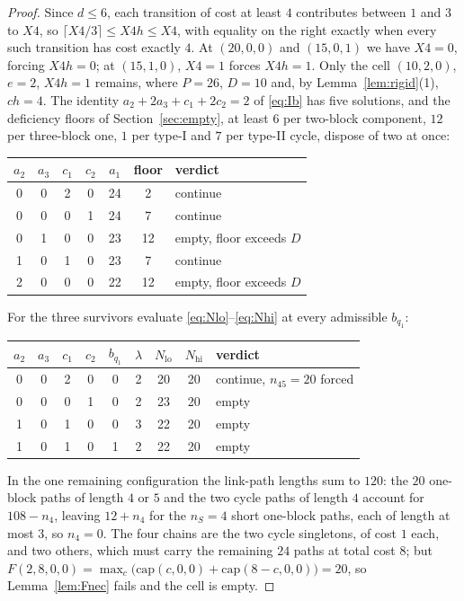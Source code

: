 \documentclass[10pt]{article}
\theoremstyle{remark}
\theoremstyle{plain}
\newcommand{\NCh}{\mathit{ch}}
\begin{document}
\begin{proof}
Since $d\le 6$, each transition of cost at least $4$ contributes
between $1$ and $3$ to $X4$, so $\lceil X4/3\rceil\le X4h\le X4$, with
equality on the right exactly when every such transition has cost
exactly $4$.  At $(20,0,0)$ and $(15,0,1)$ we have $X4=0$, forcing
$X4h=0$; at $(15,1,0)$, $X4=1$ forces $X4h=1$.  Only the cell
$(10,2,0)$, $e=2$, $X4h=1$ remains, where $P=26$, $D=10$ and, by
Lemma~\ref{lem:rigid}(1), $\NCh=4$.  The identity
$a_2+2a_3+c_1+2c_2=2$ of \eqref{eq:Ib} has five solutions, and the
deficiency floors of Section~\ref{sec:empty}, at least $6$ per
two-block component, $12$ per three-block one, $1$ per type-I and $7$
per type-II cycle, dispose of two at once:
\begin{center}\small
\begin{tabular}{@{}cccc c c l@{}}
\toprule
$a_2$&$a_3$&$c_1$&$c_2$ & $a_1$ & floor & verdict\\
\midrule
0&0&2&0 & 24 & 2  & continue\\
0&0&0&1 & 24 & 7  & continue\\
0&1&0&0 & 23 & 12 & empty, floor exceeds $D$\\
1&0&1&0 & 23 & 7  & continue\\
2&0&0&0 & 22 & 12 & empty, floor exceeds $D$\\
\bottomrule
\end{tabular}
\end{center}
For the three survivors evaluate \eqref{eq:Nlo}--\eqref{eq:Nhi} at
every admissible $b_{q_1}$:
\begin{center}\small
\begin{tabular}{@{}ccccc c cc l@{}}
\toprule
$a_2$&$a_3$&$c_1$&$c_2$&$b_{q_1}$ & $\lambda$ &
$N_{\mathrm{lo}}$&$N_{\mathrm{hi}}$ & verdict\\
\midrule
0&0&2&0&0 & 2 & 20 & 20 & continue, $n_{45}=20$ forced\\
0&0&0&1&0 & 2 & 23 & 20 & empty\\
1&0&1&0&0 & 3 & 22 & 20 & empty\\
1&0&1&0&1 & 2 & 22 & 20 & empty\\
\bottomrule
\end{tabular}
\end{center}
In the one remaining configuration the link-path lengths sum to $120$:
the $20$ one-block paths of length $4$ or $5$ and the two cycle paths
of length $4$ account for $108-n_4$, leaving $12+n_4$ for the $n_S=4$
short one-block paths, each of length at most $3$, so $n_4=0$.  The
four chains are the two cycle singletons, of cost $1$ each, and two
others, which must carry the remaining $24$ paths at total cost $8$;
but $F(2,8,0,0)=\max_c\bigl(\mathrm{cap}(c,0,0)+\mathrm{cap}(8-c,0,0)
\bigr)=20$, so Lemma~\ref{lem:Fnec} fails and the cell is empty.
\end{proof}
\end{document}
